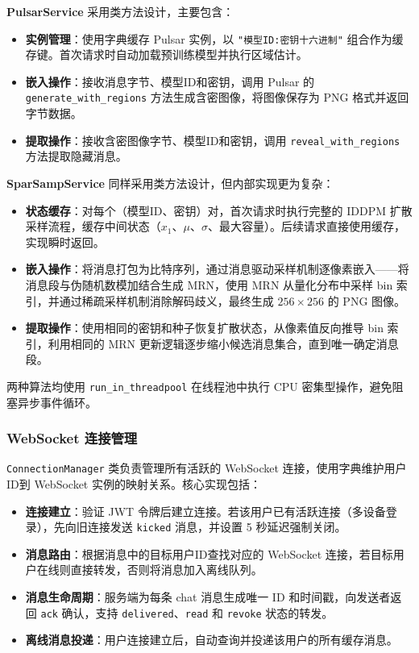 \textbf{PulsarService} 采用类方法设计，主要包含：

\begin{itemize}
    \item \textbf{实例管理}：使用字典缓存 Pulsar 实例，以 \texttt{"模型ID:密钥十六进制"} 组合作为缓存键。首次请求时自动加载预训练模型并执行区域估计。
    \item \textbf{嵌入操作}：接收消息字节、模型ID和密钥，调用 Pulsar 的 \texttt{generate\_with\_regions} 方法生成含密图像，将图像保存为 PNG 格式并返回字节数据。
    \item \textbf{提取操作}：接收含密图像字节、模型ID和密钥，调用 \texttt{reveal\_with\_regions} 方法提取隐藏消息。
\end{itemize}

\textbf{SparSampService} 同样采用类方法设计，但内部实现更为复杂：

\begin{itemize}
    \item \textbf{状态缓存}：对每个（模型ID、密钥）对，首次请求时执行完整的 IDDPM 扩散采样流程，缓存中间状态（$x_1$、$\mu$、$\sigma$、最大容量）。后续请求直接使用缓存，实现瞬时返回。
    \item \textbf{嵌入操作}：将消息打包为比特序列，通过消息驱动采样机制逐像素嵌入——将消息段与伪随机数模加结合生成 MRN，使用 MRN 从量化分布中采样 bin 索引，并通过稀疏采样机制消除解码歧义，最终生成 $256 \times 256$ 的 PNG 图像。
    \item \textbf{提取操作}：使用相同的密钥和种子恢复扩散状态，从像素值反向推导 bin 索引，利用相同的 MRN 更新逻辑逐步缩小候选消息集合，直到唯一确定消息段。
\end{itemize}

两种算法均使用 \texttt{run\_in\_threadpool} 在线程池中执行 CPU 密集型操作，避免阻塞异步事件循环。

\subsubsection{WebSocket 连接管理}

\texttt{ConnectionManager} 类负责管理所有活跃的 WebSocket 连接，使用字典维护用户ID到 WebSocket 实例的映射关系。核心实现包括：

\begin{itemize}
    \item \textbf{连接建立}：验证 JWT 令牌后建立连接。若该用户已有活跃连接（多设备登录），先向旧连接发送 \texttt{kicked} 消息，并设置 5 秒延迟强制关闭。
    \item \textbf{消息路由}：根据消息中的目标用户ID查找对应的 WebSocket 连接，若目标用户在线则直接转发，否则将消息加入离线队列。
    \item \textbf{消息生命周期}：服务端为每条 chat 消息生成唯一 ID 和时间戳，向发送者返回 \texttt{ack} 确认，支持 \texttt{delivered}、\texttt{read} 和 \texttt{revoke} 状态的转发。
    \item \textbf{离线消息投递}：用户连接建立后，自动查询并投递该用户的所有缓存消息。
\end{itemize}

